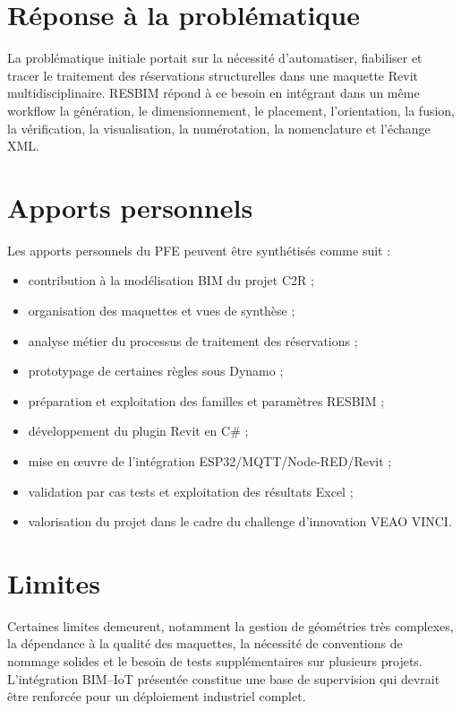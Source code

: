 \documentclass[12pt,a4paper]{report}
\begin{document}
\section*{Réponse à la problématique}
La problématique initiale portait sur la nécessité d'automatiser, fiabiliser et tracer le traitement des réservations structurelles dans une maquette Revit multidisciplinaire. RESBIM répond à ce besoin en intégrant dans un même workflow la génération, le dimensionnement, le placement, l'orientation, la fusion, la vérification, la visualisation, la numérotation, la nomenclature et l'échange XML.

\section*{Apports personnels}
Les apports personnels du PFE peuvent être synthétisés comme suit :
\begin{itemize}[leftmargin=1.2cm]
    \item contribution à la modélisation BIM du projet C2R ;
    \item organisation des maquettes et vues de synthèse ;
    \item analyse métier du processus de traitement des réservations ;
    \item prototypage de certaines règles sous Dynamo ;
    \item préparation et exploitation des familles et paramètres RESBIM ;
    \item développement du plugin Revit en C\# ;
    \item mise en œuvre de l'intégration ESP32/MQTT/Node-RED/Revit ;
    \item validation par cas tests et exploitation des résultats Excel ;
    \item valorisation du projet dans le cadre du challenge d'innovation VEAO VINCI.
\end{itemize}

\section*{Limites}
Certaines limites demeurent, notamment la gestion de géométries très complexes, la dépendance à la qualité des maquettes, la nécessité de conventions de nommage solides et le besoin de tests supplémentaires sur plusieurs projets. L'intégration BIM--IoT présentée constitue une base de supervision qui devrait être renforcée pour un déploiement industriel complet.
\end{document}
